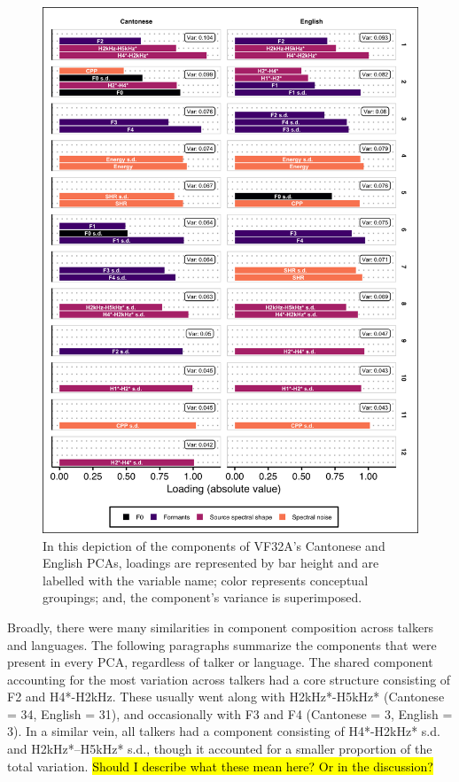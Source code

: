 \begin{figure}[htbp]
\begin{center}
\includegraphics[width=0.875\linewidth]{figures/ch3_pca_vf32a_vert5in.png} 
\caption{In this depiction of the components of VF32A's Cantonese and English PCAs, loadings are represented by bar height and are labelled with the variable name; color represents conceptual groupings; and, the component's variance is superimposed.}
\label{ch3:fig:VF32A}
\end{center}
\end{figure}

Broadly, there were many similarities in component composition across talkers and languages. The following paragraphs summarize the components that were present in every PCA, regardless of talker or language. The shared component accounting for the most variation across talkers had a core structure consisting of F2 and H4*-H2kHz. These usually went along with H2kHz*-H5kHz* (Cantonese = 34, English = 31), and occasionally with F3 and F4 (Cantonese = 3, English = 3). In a similar vein, all talkers had a component consisting of H4*-H2kHz* s.d. and H2kHz*--H5kHz* s.d., though it accounted for a smaller proportion of the total variation. \hl{Should I describe what these mean here? Or in the discussion?}

